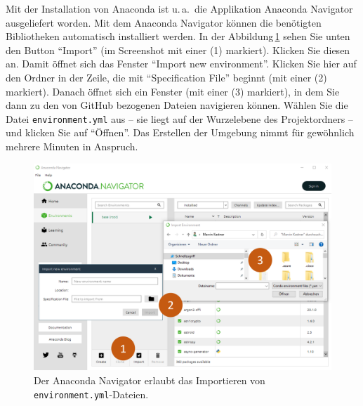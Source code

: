 \documentclass{tufte-handout}
\begin{document}
Mit der Installation von Anaconda ist u.\,a.\ die Applikation Anaconda Navigator ausgeliefert worden.
Mit dem Anaconda Navigator können die benötigten Bibliotheken automatisch installiert werden.
In der Abbildung\,\ref{fig:anaconda-navigator} sehen Sie unten den Button \enquote{Import} (im Screenshot mit einer (1) markiert).
Klicken Sie diesen an.
Damit öffnet sich das Fenster \enquote{Import new environment}.
Klicken Sie hier auf den Ordner in der Zeile, die mit 
\enquote{Specification File}
beginnt (mit einer (2) markiert).
Danach öffnet sich ein Fenster (mit einer (3) markiert), in dem Sie dann zu den von GitHub bezogenen Dateien navigieren können.
Wählen Sie die Datei \texttt{environment.yml} aus
-- sie liegt auf der Wurzelebene des Projektordners --
und klicken Sie auf \enquote{Öffnen}.
Das Erstellen der Umgebung nimmt für gewöhnlich mehrere Minuten in Anspruch.

\begin{figure}[h]
  \includegraphics{anaconda-navigator-import-new-environment--mit-reihenfolge}
  \caption{Der Anaconda Navigator erlaubt das Importieren von \texttt{environment.yml}-Dateien.}%
\label{fig:anaconda-navigator}
\end{figure}
\end{document}

